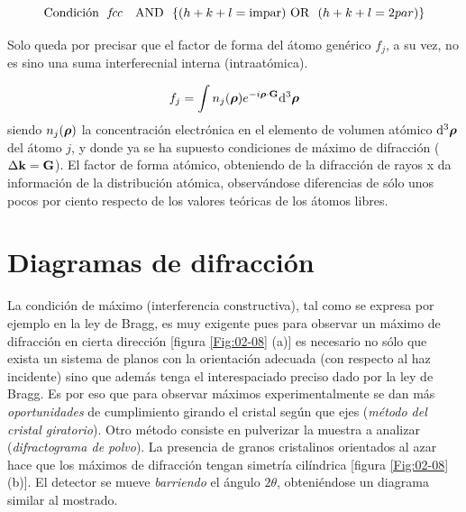 \begin{equation*}
 \text{Condición \ \textit{fcc}\ \ \ AND} \ \ \{ (h+k+l=\text{impar}) \text{\ OR \ } (h+k+l=2 par) \}
\end{equation*}

Solo queda por precisar que el factor de forma del átomo genérico $f_j$, a su vez, no es sino una suma interferecnial interna (intraatómica). \

\begin{equation}
    f_j = \int n_j (\boldsymbol{\rho}) e^{-i \boldsymbol{\rho} \cdot \mathbf{G}} \mathrm{d}^3 \boldsymbol{\rho}
\end{equation}
siendo $n_j (\boldsymbol{\rho})$ la concentración electrónica en el elemento de volumen atómico $\mathrm{d}^3 \boldsymbol{\rho}$ del átomo $j$, y donde ya se ha supuesto condiciones de máximo de difracción ($\Delta \mathbf{k}  = \mathbf{G}$). El factor de forma atómico, obteniendo de la difracción de rayos x da información de la distribución atómica, observándose diferencias de sólo unos pocos por ciento respecto de los valores teóricas de los átomos libres.

\section{Diagramas de difracción}

La condición de máximo (interferencia constructiva), tal como se expresa por ejemplo en la ley de Bragg, es muy exigente pues para observar un máximo de difracción en cierta dirección [figura \ref{Fig:02-08} (a)] es necesario no sólo que exista un sistema de planos con la orientación adecuada (con respecto al haz incidente) sino que además tenga el interespaciado preciso dado por la ley de Bragg. Es por eso que para observar máximos experimentalmente se dan más \textit{oportunidades} de cumplimiento girando el cristal según que ejes (\textit{método del cristal giratorio}). Otro método consiste en pulverizar la muestra a analizar (\textit{difractograma de polvo}). La presencia de granos cristalinos orientados al azar hace que los máximos de difracción tengan simetría cilíndrica [figura \ref{Fig:02-08} (b)]. El detector se mueve \textit{barriendo} el ángulo $2\theta$, obteniéndose un diagrama similar al mostrado. 

